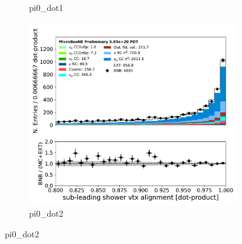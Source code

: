 \begin{figure}[H]
\begin{center}
\begin{subfigure}[b]{0.3\textwidth}
    \caption{\label{fig:pi0:inputs:dot1:RUN1} pi0\_dot1}
    \end{subfigure}
    \begin{subfigure}[b]{0.3\textwidth}
    \centering
    \includegraphics[width=1.00\textwidth]{pi0/inputs/pi0_dot2_03182020_presel.pdf}
    \caption{\label{fig:pi0:inputs:dot2:RUN1} pi0\_dot2}
    \end{subfigure}
\end{center}
\end{figure}

